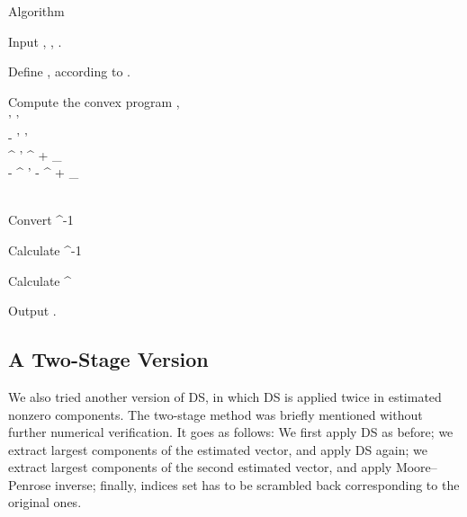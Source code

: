 \Result
{Algorithm}
{
\startitemize[n]
\item Input , , .
%
\item Define , according to .
%
\item Compute the convex program
 {
, 
\leftarrow \startcases
     \MC {} \\
    \;  \MC {}' \preceq {}' \\
   \MC - ' \preceq {}' \\
   \MC {}^\dagger {} ' \preceq {}^\dagger {} + \g_{}  \\
   \MC - ^\dagger {} ' \preceq - ^\dagger {} + \g_{}  \\
\stopcases \\
}
\item Convert
%
 {
\leftarrow {} ^{-1}  \\
}
\item Calculate
%
 {
\leftarrow {}^{-1}  \\
}
\item Calculate
%
 {
\leftarrow {}  ^\dagger \\
}
\item Output .
\stopitemize
}



\subsection {A Two-Stage Version}

We also tried another version of DS, in which DS is applied twice in estimated nonzero components.
The two-stage method was briefly mentioned \cite {CaT07} without further numerical verification.
It goes as follows:
We first apply DS as before;
we extract largest components of the estimated vector, and apply DS again;
we extract largest components of the second estimated vector, and apply Moore–Penrose inverse;
finally, indices set has to be scrambled back corresponding to the original ones.

